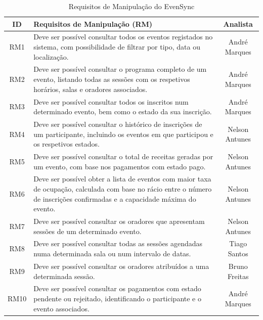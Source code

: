 \documentclass[runningheads]{llncs}
\begin{document}
                \vspace{0.2cm}

                \begin{table}[H]
                \centering
                \begin{tabular}{|c|p{}|c|}
                \hline
                \textbf{ID} & \textbf{Requisitos de Manipulação (RM)} & \textbf{Analista} \\ \hline
                RM1 & Deve ser possível consultar todos os eventos registados no sistema, com possibilidade de filtrar por tipo, data ou localização. & André Marques \\ \hline
                RM2 & Deve ser possível consultar o programa completo de um evento, listando todas as sessões com os respetivos horários, salas e oradores associados. & André Marques \\ \hline
                RM3 & Deve ser possível consultar todos os inscritos num determinado evento, bem como o estado da sua inscrição. & André Marques \\ \hline
                RM4 & Deve ser possível consultar o histórico de inscrições de um participante, incluindo os eventos em que participou e os respetivos estados. & Nelson Antunes \\ \hline
                RM5 & Deve ser possível consultar o total de receitas geradas por um evento, com base nos pagamentos com estado pago. & Nelson Antunes \\ \hline
                RM6 & Deve ser possível obter a lista de eventos com maior taxa de ocupação, calculada com base no rácio entre o número de inscrições confirmadas e a capacidade máxima do evento. & Nelson Antunes \\ \hline
                RM7 & Deve ser possível consultar os oradores que apresentam sessões de um determinado evento. & Nelson Antunes \\ \hline
                RM8 & Deve ser possível consultar todas as sessões agendadas numa determinada sala ou num intervalo de datas. & Tiago Santos \\ \hline
                RM9 & Deve ser possível consultar os oradores atribuídos a uma determinada sessão. & Bruno Freitas \\ \hline
                RM10 & Deve ser possível consultar os pagamentos com estado pendente ou rejeitado, identificando o participante e o evento associados. & André Marques \\ \hline
                \end{tabular}
                \vspace{0.2cm}
                \caption{Requisitos de Manipulação do EvenSync} \label{tab:requisitos_rm}
                \end{table}
\end{document}
